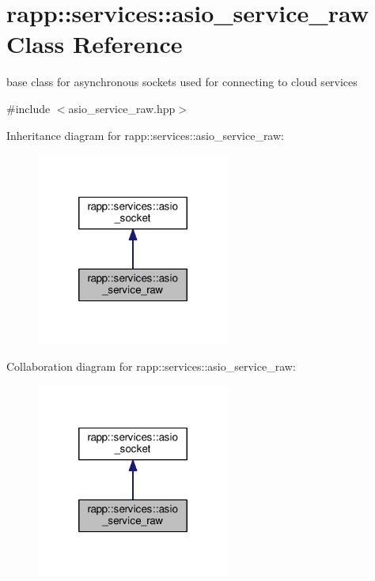 \hypertarget{classrapp_1_1services_1_1asio__service__raw}{\section{rapp\-:\-:services\-:\-:asio\-\_\-service\-\_\-raw Class Reference}
\label{classrapp_1_1services_1_1asio__service__raw}
}


base class for asynchronous sockets used for connecting to cloud services  




{\ttfamily \#include $<$asio\-\_\-service\-\_\-raw.\-hpp$>$}



Inheritance diagram for rapp\-:\-:services\-:\-:asio\-\_\-service\-\_\-raw\-:
\nopagebreak
\begin{figure}[H]
\begin{center}
\leavevmode
\includegraphics[width=180pt]{classrapp_1_1services_1_1asio__service__raw__inherit__graph}
\end{center}
\end{figure}


Collaboration diagram for rapp\-:\-:services\-:\-:asio\-\_\-service\-\_\-raw\-:
\nopagebreak
\begin{figure}[H]
\begin{center}
\leavevmode
\includegraphics[width=180pt]{classrapp_1_1services_1_1asio__service__raw__coll__graph}
\end{center}
\end{figure}
